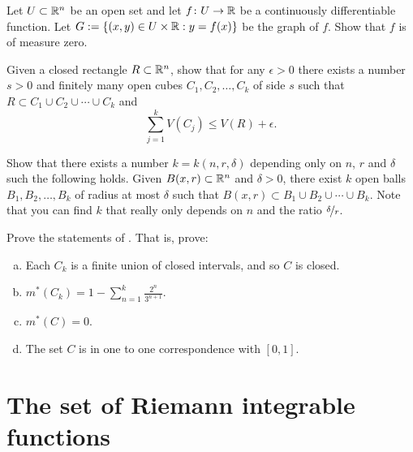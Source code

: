 \begin{exercise}
Let $U \subset {\mathbb{R}}^n$ be an open set
and let $f \colon U \to {\mathbb{R}}$ be a continuously differentiable function.
Let $G := \{ (x,y) \in U \times {\mathbb{R}} : y = f(x) \}$ be the graph of $f$.
Show that $f$ is of measure zero.
\end{exercise}

\begin{exercise}
Given a closed rectangle $R \subset {\mathbb{R}}^n$, show that for any $\epsilon > 0$
there exists a number $s > 0$ and finitely many open cubes $C_1,C_2,\ldots,C_k$
of side $s$ such that
$R \subset C_1 \cup C_2 \cup \cdots \cup C_k$
and
\begin{equation*}
\sum_{j=1}^k V(C_j) \leq V(R) + \epsilon .
\end{equation*}
\end{exercise}

\begin{exercise}
Show that there exists a number $k = k(n,r,\delta)$ depending only on $n$,
$r$ and $\delta$ such
the following holds.
Given $B(x,r) \subset {\mathbb{R}}^n$ and $\delta > 0$, there exist
$k$ open balls $B_1,B_2,\ldots,B_k$ of radius at most
$\delta$ such that $B(x,r) \subset B_1 \cup B_2 \cup \cdots \cup B_k$.
Note that you can find $k$ that really only depends on $n$ and the ratio
$\nicefrac{\delta}{r}$.
\end{exercise}

\begin{exercise}
Prove the statements of .  That is,
prove:
\begin{enumerate}[a)]
\item
Each $C_k$ is a finite union of closed intervals, and so $C$ is closed.
\item
$m^*(C_k) =1 - \sum_{n=1}^k \frac{2^n}{3^{n+1}}$.
\item
$m^*(C) = 0$.
\item
The set $C$ is in one to one correspondence with $[0,1]$.
\end{enumerate}
\end{exercise}



\sectionnewpage
\section{The set of Riemann integrable functions }
\label{sec:riemannlebesgue}



